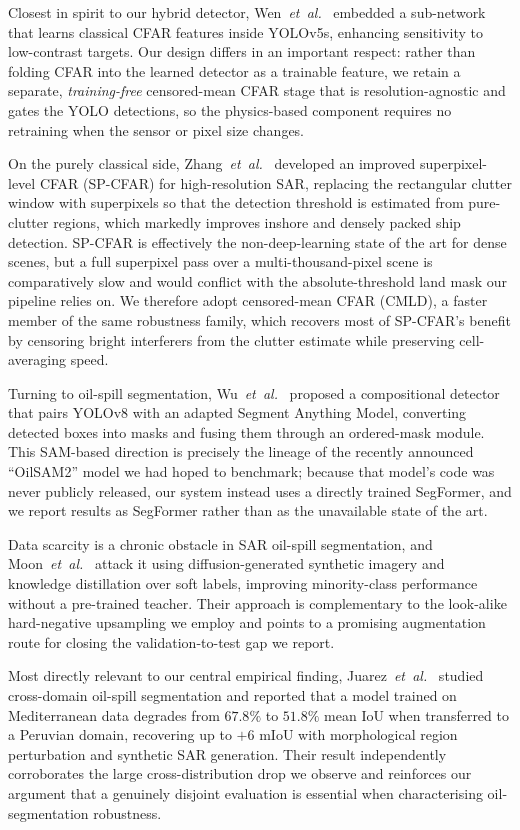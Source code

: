 \documentclass{ieeeaccess}
\begin{document}
Closest in spirit to our hybrid detector, Wen~\textit{et~al.}~\cite{10} embedded a sub-network that learns classical CFAR features inside YOLOv5s, enhancing sensitivity to low-contrast targets. Our design differs in an important respect: rather than folding CFAR into the learned detector as a trainable feature, we retain a separate, \emph{training-free} censored-mean CFAR stage that is resolution-agnostic and gates the YOLO detections, so the physics-based component requires no retraining when the sensor or pixel size changes.

On the purely classical side, Zhang~\textit{et~al.}~\cite{11} developed an improved superpixel-level CFAR (SP-CFAR) for high-resolution SAR, replacing the rectangular clutter window with superpixels so that the detection threshold is estimated from pure-clutter regions, which markedly improves inshore and densely packed ship detection. SP-CFAR is effectively the non-deep-learning state of the art for dense scenes, but a full superpixel pass over a multi-thousand-pixel scene is comparatively slow and would conflict with the absolute-threshold land mask our pipeline relies on. We therefore adopt censored-mean CFAR (CMLD), a faster member of the same robustness family, which recovers most of SP-CFAR's benefit by censoring bright interferers from the clutter estimate while preserving cell-averaging speed.

Turning to oil-spill segmentation, Wu~\textit{et~al.}~\cite{12} proposed a compositional detector that pairs YOLOv8 with an adapted Segment Anything Model, converting detected boxes into masks and fusing them through an ordered-mask module. This SAM-based direction is precisely the lineage of the recently announced ``OilSAM2'' model we had hoped to benchmark; because that model's code was never publicly released, our system instead uses a directly trained SegFormer, and we report results as SegFormer rather than as the unavailable state of the art.

Data scarcity is a chronic obstacle in SAR oil-spill segmentation, and Moon~\textit{et~al.}~\cite{13} attack it using diffusion-generated synthetic imagery and knowledge distillation over soft labels, improving minority-class performance without a pre-trained teacher. Their approach is complementary to the look-alike hard-negative upsampling we employ and points to a promising augmentation route for closing the validation-to-test gap we report.

Most directly relevant to our central empirical finding, Juarez~\textit{et~al.}~\cite{14} studied cross-domain oil-spill segmentation and reported that a model trained on Mediterranean data degrades from $67.8\%$ to $51.8\%$ mean IoU when transferred to a Peruvian domain, recovering up to $+6$ mIoU with morphological region perturbation and synthetic SAR generation. Their result independently corroborates the large cross-distribution drop we observe and reinforces our argument that a genuinely disjoint evaluation is essential when characterising oil-segmentation robustness.
\end{document}
